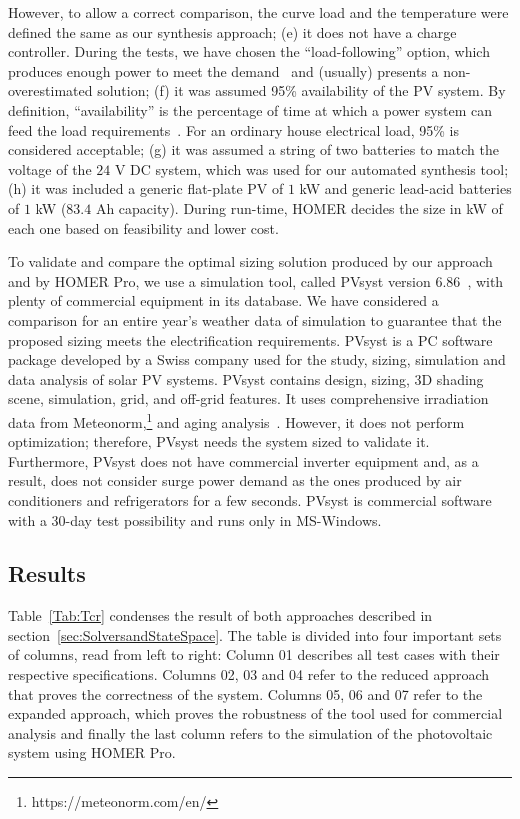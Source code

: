 \documentclass[10pt,journal,compsoc]{IEEEtran}
\begin{document}
However, to allow a correct comparison, the curve load and the temperature were defined the same as our synthesis approach; 
(e) it does not have a charge controller. During the tests, we have chosen the ``load-following'' option, which produces enough power to meet the demand~\cite{HOMER} and (usually) presents a non-overestimated solution; 
(f) it was assumed 95\% availability of the PV system. By definition, ``availability'' is the percentage of time at which a power system can feed the load requirements~\cite{Khatib2014}. For an ordinary house electrical load, 95\% is considered acceptable;
(g) it was assumed a string of two batteries to match the voltage of the $24$ V DC system, which was used for our automated synthesis tool; 
(h) it was included a generic flat-plate PV of $1$ kW and generic lead-acid batteries of $1$ kW ($83.4$ Ah capacity). During run-time, HOMER decides the size in kW of each one based on feasibility and lower cost.

To validate and compare the optimal sizing solution produced by our approach and by HOMER Pro, we use a simulation tool, called PVsyst version $6.86$~\cite{PVsyst}, with plenty of commercial equipment in its database. We have considered a comparison for an entire year's weather data of simulation to guarantee that the proposed sizing meets the electrification requirements. PVsyst is a PC software package developed by a Swiss company used for the study, sizing, simulation and data analysis of solar PV systems. PVsyst contains design, sizing, 3D shading scene, simulation, grid, and off-grid features. It uses comprehensive irradiation data from Meteonorm,\footnote{https://meteonorm.com/en/} and aging analysis~\cite{PVsyst2017}. However, it does not perform optimization; therefore, PVsyst needs the system sized to validate it. Furthermore, PVsyst does not have commercial inverter equipment and, as a result, does not consider surge power demand as the ones produced by air conditioners and refrigerators for a few seconds. PVsyst is commercial software with a $30$-day test possibility and runs only in MS-Windows.

\subsection{Results}

\color{blue} Table~\ref{Tab:Tcr} condenses the result of both approaches described in section~\ref{sec:SolversandStateSpace}. The table is divided into four important sets of columns, read from left to right: Column 01 describes all test cases with their respective specifications. Columns 02, 03 and 04 refer to the reduced approach that proves the correctness of the system. Columns 05, 06 and 07 refer to the expanded approach, which proves the robustness of the tool used for commercial analysis and finally the last column refers to the simulation of the photovoltaic system using HOMER Pro.
\end{document}
